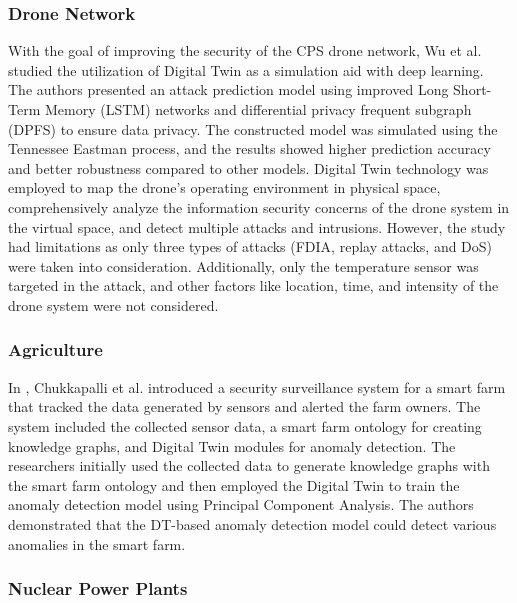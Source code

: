 \subsubsection*{Drone Network}
With the goal of improving the security of the CPS drone network, Wu et al. \cite{wuDeepLearningDriven2022} studied the utilization of Digital Twin as a simulation aid with deep learning. The authors presented an attack prediction model using improved Long Short-Term Memory (LSTM) networks and differential privacy frequent subgraph (DPFS) to ensure data privacy. The constructed model was simulated using the Tennessee Eastman process, and the results showed higher prediction accuracy and better robustness compared to other models. Digital Twin technology was employed to map the drone's operating environment in physical space, comprehensively analyze the information security concerns of the drone system in the virtual space, and detect multiple attacks and intrusions. However, the study had limitations as only three types of attacks (FDIA, replay attacks, and DoS) were taken into consideration. Additionally, only the temperature sensor was targeted in the attack, and other factors like location, time, and intensity of the drone system were not considered.


\subsubsection*{Agriculture}

In \cite{chukkapalliCyberPhysicalSystemSecurity2021}, Chukkapalli et al. introduced a security surveillance system for a smart farm that tracked the data generated by sensors and alerted the farm owners. The system included the collected sensor data, a smart farm ontology for creating knowledge graphs, and Digital Twin modules for anomaly detection. The researchers initially used the collected data to generate knowledge graphs with the smart farm ontology and then employed the Digital Twin to train the anomaly detection model using Principal Component Analysis. The authors demonstrated that the DT-based anomaly detection model could detect various anomalies in the smart farm.

\subsubsection*{Nuclear Power Plants}

